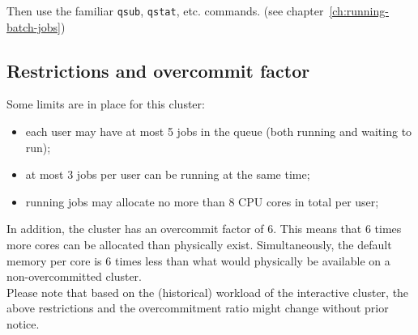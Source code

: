 \begin{prompt}
\end{prompt}

Then use the familiar \lstinline|qsub|, \lstinline|qstat|, etc. commands. (see chapter~\ref{ch:running-batch-jobs})

\subsection{Restrictions and overcommit factor}
\label{subsec:interactive_ugent_restrictions}

Some limits are in place for this cluster:
\begin{itemize}
  \item each user may have at most 5 jobs in the queue (both running and waiting to run);
  \item at most 3 jobs per user can be running at the same time;
  \item running jobs may allocate no more than 8 CPU cores in total per user;
\end{itemize}

In addition, the cluster has an overcommit factor of 6. This means that 6 times more cores
can be allocated than physically exist. Simultaneously, the default memory per core is 6
times less than what would physically be available on a non-overcommitted cluster.
 \\
Please note that based on the (historical) workload of the interactive cluster, the above
restrictions and the overcommitment ratio might change without prior notice.
